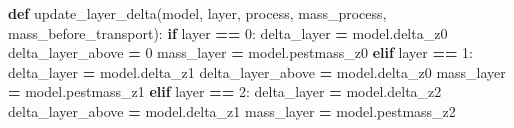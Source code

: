 \documentclass[]{article}
\newenvironment{Shaded}{\begin{snugshade}}{\end{snugshade}}
\newcommand{\KeywordTok}[1]{\textcolor[rgb]{0.13,0.29,0.53}{\textbf{#1}}}
\newcommand{\DecValTok}[1]{\textcolor[rgb]{0.00,0.00,0.81}{#1}}
\newcommand{\ControlFlowTok}[1]{\textcolor[rgb]{0.13,0.29,0.53}{\textbf{#1}}}
\newcommand{\OperatorTok}[1]{\textcolor[rgb]{0.81,0.36,0.00}{\textbf{#1}}}
\newcommand{\NormalTok}[1]{#1}
\begin{document}
\begin{Shaded}
\begin{Highlighting}[]
\KeywordTok{def}\NormalTok{ update_layer_delta(model, layer, process, mass_process, mass_before_transport):}
    \ControlFlowTok{if}\NormalTok{ layer }\OperatorTok{==} \DecValTok{0}\NormalTok{:}
\NormalTok{      delta_layer }\OperatorTok{=}\NormalTok{ model.delta_z0}
\NormalTok{      delta_layer_above }\OperatorTok{=} \DecValTok{0}
\NormalTok{      mass_layer }\OperatorTok{=}\NormalTok{ model.pestmass_z0}
    \ControlFlowTok{elif}\NormalTok{ layer }\OperatorTok{==} \DecValTok{1}\NormalTok{:}
\NormalTok{        delta_layer }\OperatorTok{=}\NormalTok{ model.delta_z1}
\NormalTok{        delta_layer_above }\OperatorTok{=}\NormalTok{ model.delta_z0}
\NormalTok{        mass_layer }\OperatorTok{=}\NormalTok{ model.pestmass_z1}
    \ControlFlowTok{elif}\NormalTok{ layer }\OperatorTok{==} \DecValTok{2}\NormalTok{:}
\NormalTok{        delta_layer }\OperatorTok{=}\NormalTok{ model.delta_z2}
\NormalTok{        delta_layer_above }\OperatorTok{=}\NormalTok{ model.delta_z1}
\NormalTok{        mass_layer }\OperatorTok{=}\NormalTok{ model.pestmass_z2}
        

\end{Highlighting}
\end{Shaded}
\end{document}
